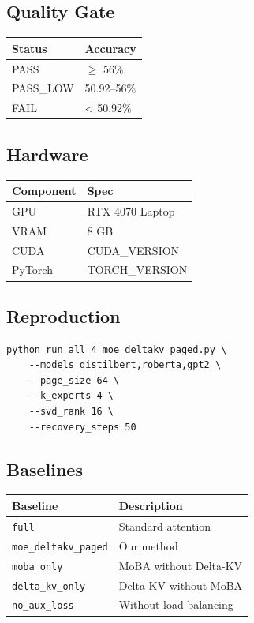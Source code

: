 \subsection{Quality Gate}

\begin{table}[H]
\centering
\small
\begin{tabular}{ll}
\toprule
\textbf{Status} & \textbf{Accuracy} \\
\midrule
PASS & $\ge$ 56\% \\
PASS\_LOW & 50.92--56\% \\
FAIL & < 50.92\% \\
\bottomrule
\end{tabular}
\end{table}

\subsection{Hardware}

\begin{table}[H]
\centering
\small
\begin{tabular}{ll}
\toprule
\textbf{Component} & \textbf{Spec} \\
\midrule
GPU & RTX 4070 Laptop \\
VRAM & 8 GB \\
CUDA & {{CUDA\_VERSION}} \\
PyTorch & {{TORCH\_VERSION}} \\
\bottomrule
\end{tabular}
\end{table}

\subsection{Reproduction}

\begin{lstlisting}
python run_all_4_moe_deltakv_paged.py \
    --models distilbert,roberta,gpt2 \
    --page_size 64 \
    --k_experts 4 \
    --svd_rank 16 \
    --recovery_steps 50
\end{lstlisting}

\subsection{Baselines}

\begin{table}[H]
\centering
\small
\begin{tabular}{ll}
\toprule
\textbf{Baseline} & \textbf{Description} \\
\midrule
\texttt{full} & Standard attention \\
\texttt{moe\_deltakv\_paged} & Our method \\
\texttt{moba\_only} & MoBA without Delta-KV \\
\texttt{delta\_kv\_only} & Delta-KV without MoBA \\
\texttt{no\_aux\_loss} & Without load balancing \\
\bottomrule
\end{tabular}
\end{table}

